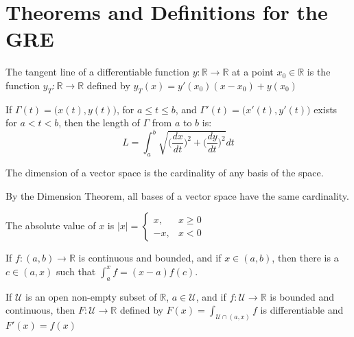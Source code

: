 \documentclass[crop=false,class=book,oneside]{standalone}
\begin{document}
    \section{Theorems and Definitions for the GRE}
        \begin{definition*}
                The tangent line of a differentiable function
                $y:\mathbb{R}\rightarrow\mathbb{R}$ at a point
                $x_{0}\in\mathbb{R}$ is the function
                $y_{T}:\mathbb{R}\rightarrow\mathbb{R}$ defined by
                $y_{T}(x)=y'(x_0)(x-x_0)+y(x_0)$ 
            \end{definition*}
        \begin{definition*}
            If $\Gamma(t)=\big(x(t),y(t)\big)$, for $a\leq t\leq b$,
            and $\Gamma'(t)=\big(x'(t),y'(t)\big)$ exists for
            $a<t<b$, then the length of $\Gamma$ from $a$ to $b$ is:
            \begin{equation}
                L=\int_{a}^{b}\sqrt{
                    \bigg(\frac{dx}{dt}\bigg)^{2}+
                    \bigg(\frac{dy}{dt}\bigg)^{2}
                }dt
            \end{equation}
        \end{definition*}
        \begin{definition*}
            The dimension of a vector space is the cardinality of
            any basis of the space. 
        \end{definition*}
        \begin{remark*}
            By the Dimension Theorem, all bases of a vector space
            have the same cardinality.
        \end{remark*}
        \begin{definition*}
            The absolute value of $x$ is
            $|x|=\begin{cases}%
                x,&x\geq 0\\ 
                -x,&x<0
            \end{cases}$
        \end{definition*}
        \begin{theorem*}
            If $f:(a,b)\rightarrow\mathbb{R}$ is continuous and
            bounded, and if $x\in(a,b)$, then there is a $c\in(a,x)$
            such that $\int_{a}^{x}f=(x-a)f(c)$.
        \end{theorem*}
        \begin{theorem*}
            If $\mathcal{U}$ is an open non-empty subset of
            $\mathbb{R}$, $a\in\mathcal{U}$, and if
            $f:\mathcal{U}\rightarrow\mathbb{R}$
            is bounded and continuous, then
            $F:\mathcal{U}\rightarrow\mathbb{R}$
            defined by $F(x)=\int_{\mathcal{U}\cap (a,x)}f$ is
            differentiable and $F'(x)=f(x)$
        \end{theorem*}
\end{document}
